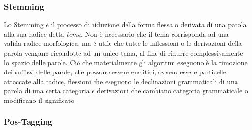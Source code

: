 \subsubsection{Stemming}
Lo Stemming è il processo di riduzione della forma flessa o derivata di una parola alla sua radice detta \emph{tema}. 
Non è necessario che il tema corrisponda ad una valida radice morfologica, ma è utile che tutte le inflessioni o le derivazioni della parola
vengano ricondotte ad un unico tema, al fine di ridurre complessivamente lo spazio delle parole. 
 Ciò che materialmente gli algoritmi eseguono è la rimozione dei suffissi delle parole, che possono essere enclitici, ovvero essere particelle attaccate alla radice, flessioni che eseguono le declinazioni grammaticali di una parola di una certa categoria e derivazioni che cambiano categoria grammaticale o modificano il significato  

\subsubsection{Pos-Tagging}
 
